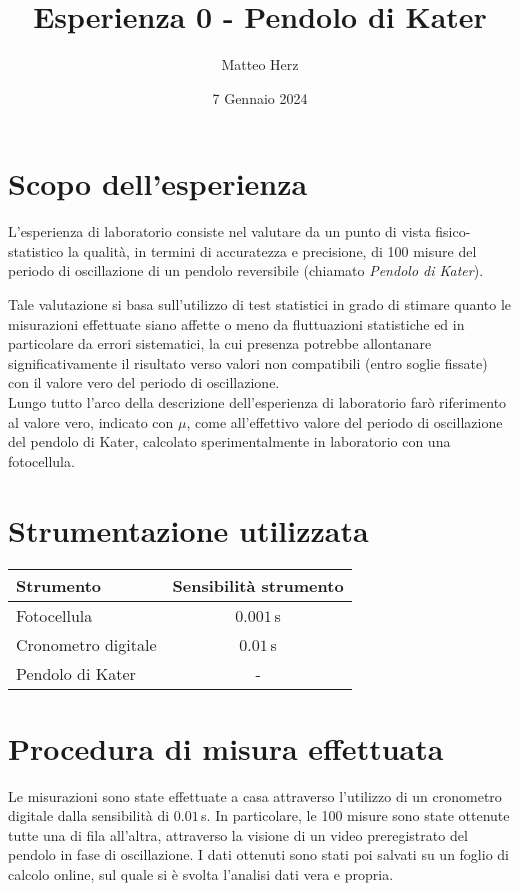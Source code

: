 \documentclass{article}
\title{Esperienza 0 - Pendolo di Kater}
\author{Matteo Herz}
\date{7 Gennaio 2024}
\begin{document}


\newpage

\tableofcontents 

\newpage 
\section{Scopo dell'esperienza}
L'esperienza di laboratorio consiste nel valutare da un punto di vista fisico-statistico la qualità, in termini di accuratezza e precisione, di 100 misure del periodo di oscillazione di un pendolo reversibile (chiamato \textit{Pendolo di Kater}). 

Tale valutazione si basa sull'utilizzo di test statistici in grado di stimare quanto le misurazioni effettuate siano affette o meno da fluttuazioni statistiche ed in particolare da errori sistematici, la cui presenza potrebbe allontanare significativamente il risultato verso valori non compatibili (entro soglie fissate) con il valore vero del periodo di oscillazione.\\

Lungo tutto l'arco della descrizione dell'esperienza di laboratorio farò riferimento al valore vero, indicato con $\mu$, come all'effettivo valore del periodo di oscillazione del pendolo di Kater, calcolato sperimentalmente in laboratorio con una fotocellula.

\section{Strumentazione utilizzata}

\begin{table}[ht]
	\centering
	\begin{tabular}{@{}lc@{}}
		\toprule
		\textbf{Strumento} & \textbf{Sensibilità strumento} \\
		\midrule
		Fotocellula & $0.001\,$s \\
		Cronometro digitale & $0.01\,$s \\
		Pendolo di Kater & - \\
		\bottomrule
	\end{tabular}
\end{table}

\section{Procedura di misura effettuata}
Le misurazioni sono state effettuate a casa attraverso l'utilizzo di un cronometro digitale dalla sensibilità di $0.01\,$s.
In particolare, le 100 misure sono state ottenute tutte una di fila all'altra, attraverso la visione di un video preregistrato del pendolo in fase di oscillazione. I dati ottenuti sono stati poi salvati su un foglio di calcolo online, sul quale si è svolta l'analisi dati vera e propria. 
\end{document}
